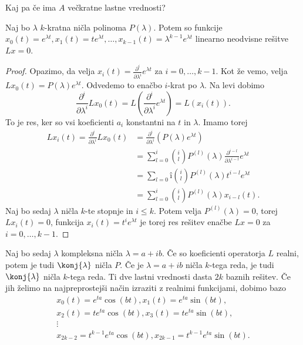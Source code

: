 Kaj pa če ima $A$ večkratne lastne vrednosti?

\begin{trditev}
  Naj bo $\lambda$ $k$-kratna ničla polinoma $P(\lambda)$.
  Potem so funkcije $x_0(t) = e^{\lambda t}, x_1(t) = t e^{\lambda t}, \ldots,
  x_{k-1}(t) = \lambda^{k-1} e^{\lambda t}$ linearno neodvisne rešitve $Lx = 0$.
\end{trditev}

\begin{proof}
  Opazimo, da velja $x_i(t) = \frac{\partial^i}{\partial \lambda^i} e^{\lambda
	t}$ za $i=0, \ldots, k-1$.
  Kot že vemo, velja $L x_0(t) = P(\lambda) e^{\lambda t}$.
  Odvedemo to enačbo $i$-krat po $\lambda$.
  Na levi dobimo
  \[
	\frac{\partial^i}{\partial \lambda^i} L x_0(t)
	= L(\frac{\partial^i}{\partial \lambda^i} e^{\lambda t})
	= L(x_i(t)).
  \]
  To je res, ker so vsi koeficienti $a_i$ konstantni na $t$ in $\lambda$.
  Imamo torej
  \begin{align*}
	L x_i(t) = \frac{\partial^i}{\partial \lambda^i} L x_0(t)
	&= \frac{\partial^i}{\partial \lambda^i} (P(\lambda) e^{\lambda t}) \\
	&= \sum_{l=0}^i \binom{i}{l} P^{(l)}(\lambda) \frac{\partial^{i-l}}{\partial
	\lambda^{i-l}} e^{\lambda t} \\
	&= \sum_{l=0} î \binom{i}{l} P^{(l)}(\lambda) t^{i-l} e^{\lambda t} \\
	&= \sum_{l=0}^i \binom{i}{l} P^{(l)}(\lambda) x_{i-l}(t).
  \end{align*}
  Naj bo sedaj $\lambda$ ničla $k$-te stopnje in $i \le k$.
  Potem velja $P^{(l)}(\lambda) = 0$, torej $L x_i(t) = 0$, funkcija $x_i(t) =
  t^i e^{\lambda t}$ je torej res rešitev enačbe $Lx = 0$ za $i = 0, \ldots,
  k-1$.
\end{proof}


Naj bo sedaj $\lambda$ kompleksna ničla $\lambda = a + ib$.
Če so koeficienti operatorja $L$ realni, potem je tudi $\konj{\lambda}$ ničla
$P$.
Če je $\lambda = a+ib$ ničla $k$-tega reda, je tudi $\konj{\lambda}$ ničla
$k$-tega reda.
Ti dve lastni vrednosti dasta $2k$ baznih rešitev.
Če jih želimo na najpreprostejši način izraziti z realnimi funkcijami, dobimo
bazo
\begin{gather*}
  x_0(t) = e^{ta} \cos(bt), x_1(t) = e^{ta} \sin(bt), \\
  x_2(t) = t e^{ta} \cos(bt), x_3(t) = t e^{ta} \sin(bt), \\
  \vdots \\
  x_{2k-2} = t^{k-1} e^{ta} \cos(bt), x_{2k-1} = t^{k-1} e^{ta} \sin(bt).
\end{gather*}

